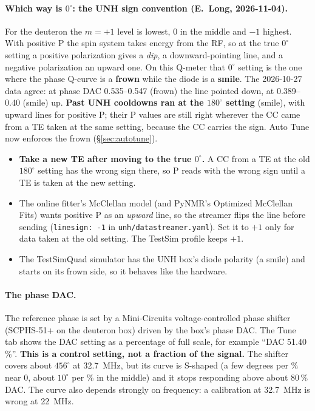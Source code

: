 \documentclass[11pt]{article}
\newcommand{\code}[1]{\texttt{\begingroup\def\_{\textunderscore\allowbreak}#1\endgroup}}
\begin{document}
\paragraph{Which way is $0^\circ$: the UNH sign convention (E.~Long, 2026-11-04).} For the deuteron the $m=+1$ level
is lowest, $0$ in the middle and $-1$ highest. With positive P the spin system takes energy from the RF, so at the
true $0^\circ$ setting a positive polarization gives a \emph{dip}, a downward-pointing line, and a negative
polarization an upward one. On this Q-meter that $0^\circ$ setting is the one where the phase Q-curve is a
\textbf{frown} while the diode is a \textbf{smile}. The 2026-10-27 data agree: at phase DAC 0.535--0.547 (frown) the
line pointed down, at 0.389--0.40 (smile) up. \textbf{Past UNH cooldowns ran at the $180^\circ$ setting} (smile),
with upward lines for positive P; their P values are still right wherever the CC came from a TE taken at the same
setting, because the CC carries the sign. Auto Tune now enforces the frown (\S\ref{sec:autotune}).
\begin{itemize}
\item \textbf{Take a new TE after moving to the true $0^\circ$.} A CC from a TE at the old $180^\circ$ setting has the
  wrong sign there, so P reads with the wrong sign until a TE is taken at the new setting.
\item The online fitter's McClellan model (and PyNMR's Optimized McClellan Fits) wants positive P as an \emph{upward}
  line, so the streamer flips the line before sending (\code{line\_sign: -1} in \code{unh/data\_streamer.yaml}).
  Set it to $+1$ only for data taken at the old setting. The TestSim profile keeps $+1$.
\item The TestSimQuad simulator has the UNH box's diode polarity (a smile) and starts on its frown side, so it
  behaves like the hardware.
\end{itemize}

\paragraph{The phase DAC.} The reference phase is set by a Mini-Circuits voltage-controlled phase shifter
(SCPHS-51+ on the deuteron box) driven by the box's phase DAC. The Tune tab shows the DAC setting as a
percentage of full scale, for example ``DAC 51.40\,\%''. \textbf{This is a control setting, not a fraction of
the signal.} The shifter covers about $456^\circ$ at 32.7~MHz, but its curve is S-shaped (a few degrees per
\% near 0, about $10^\circ$ per \% in the middle) and it stops responding above about 80\,\% DAC. The curve
also depends strongly on frequency: a calibration at 32.7~MHz is wrong at 22~MHz.
\end{document}
